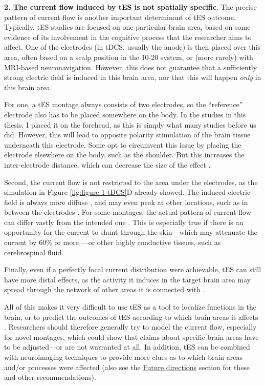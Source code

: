 \documentclass[11pt,english,]{memoir}
\begin{document}
\textbf{2. The current flow induced by tES is not spatially specific}. The precise pattern of current flow is another important determinant of tES outcome. Typically, tES studies are focused on one particular brain area, based on some evidence of its involvement in the cognitive process that the researcher aims to affect. One of the electrodes (in tDCS, usually the anode) is then placed over this area, often based on a scalp position in the 10-20 system, or (more rarely) with MRI-based neuronavigation. However, this does not guarantee that a sufficiently strong electric field is induced in this brain area, nor that this will happen \emph{only} in this brain area.

For one, a tES montage always consists of two electrodes, so the ``reference'' electrode also has to be placed somewhere on the body. In the studies in this thesis, I placed it on the forehead, as this is simply what many studies before us did. However, this will lead to opposite polarity stimulation of the brain tissue underneath this electrode. Some opt to circumvent this issue by placing the electrode elsewhere on the body, such as the shoulder. But this increases the inter-electrode distance, which can decrease the size of the effect \autocites{Moliadze2010}{Opitz2015}.

Second, the current flow is not restricted to the area under the electrodes, as the simulation in Figure \ref{fig:figure-1-tDCS}D already showed. The induced electric field is always more diffuse \autocite{Opitz2015}, and may even peak at other locations, such as in between the electrodes \autocite{Saturnino2017}. For some montages, the actual pattern of current flow can differ vastly from the intended one \autocite{Karabanov2019}. This is especially true if there is an opportunity for the current to shunt through the skin---which may attenuate the current by 60\% or more \autocite{Voroslakos2018}---or other highly conductive tissues, such as cerebrospinal fluid.

Finally, even if a perfectly focal current distribution were achievable, tES can still have more distal effects, as the activity it induces in the target brain area may spread through the network of other areas it is connected with \autocites{Knotkova2019}{Wokke2015}.

All of this makes it very difficult to use tES as a tool to localize functions in the brain, or to predict the outcomes of tES according to which brain areas it affects \autocite{Karabanov2019}. Researchers should therefore generally try to model the current flow, especially for novel montages, which could show that claims about specific brain areas have to be adjusted---or are not warranted at all. In addition, tES can be combined with neuroimaging techniques to provide more clues as to which brain areas and/or processes were affected (also see the \protect\hyperlink{discussion-future}{Future directions} section for these and other recommendations).
\end{document}
